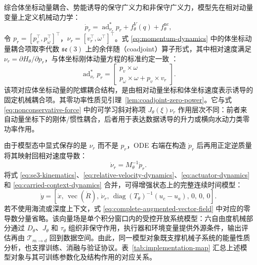 \documentclass[UTF8,zihao=-4]{ctexrep}
\newcommand{\se}{\mathfrak{se}}
\newcommand{\ad}{\operatorname{ad}}
\begin{document}
综合体坐标动量耦合、势能诱导的保守广义力和非保守广义力，模型先在相对动量变量上定义机械动力学：
\begin{equation}
  \dot p_r
  =
  \ad_{\nu_r}^\ast p_r
  +f_\theta^{V}(q)
  +f_\theta^{\mathrm{nc}},
  \label{eq:momentum-dynamics}
\end{equation}
令 \(p_r=[p_v^\top,p_\omega^\top]^\top\)，\(\nu_r=[v_r^\top,\omega^\top]^\top\)。式 \eqref{eq:momentum-dynamics} 中的体坐标动量耦合项取李代数 \(\se(3)\) 上的余伴随（coadjoint）算子形式，其中相对速度满足 \(\nu_r=\partial H_\theta/\partial p_r\)，与体坐标刚体动量方程的标准约定一致 \citep{bullo2004geometric,fossen2011handbook}：
\begin{equation}
  \ad_{\nu_r}^{\ast}p_r
  =
  \begin{bmatrix}
    p_v\times\omega\\
    p_\omega\times\omega+p_v\times v_r
  \end{bmatrix}.
  \label{eq:coadjoint-term}
\end{equation}
该项对应体坐标动量的陀螺耦合结构，是由相对动量坐标和体坐标速度表示诱导的固定机械耦合项。其零功率性质见引理~\ref{lem:coadjoint-zero-power}。它与式 \eqref{eq:nonconservative-force} 中的可学习斜对称项 \(J_\theta(\xi)\nu_r\) 作用层次不同：前者来自动量坐标下的刚体/惯性耦合，后者用于表达数据诱导的升力或横向水动力类零功率作用。

由于模型态中显式保存的是 \(\nu_r\) 而不是 \(p_r\)，ODE 右端在构造 \(\dot p_r\) 后再用正定逆质量将其映射回相对速度导数：
\begin{equation}
  \dot\nu_r=M_\theta^{-1}\dot p_r .
  \label{eq:relative-velocity-dynamics}
\end{equation}
将式 \eqref{eq:se3-kinematics}、\eqref{eq:relative-velocity-dynamics}、\eqref{eq:actuator-dynamics} 和 \eqref{eq:carried-context-dynamics} 合并，可得增强状态上的完整连续时间模型：
\begin{equation}
  \dot y
  =
  \left[
  \dot x,\,
  \operatorname{vec}(\dot R),\,
  \dot\nu_r,\,
  \operatorname{diag}(T_\theta)^{-1}(u_c-u_a),\,
  0,\,
  0,\,
  0
  \right].
  \label{eq:complete-augmented-vector-field}
\end{equation}
若不使用海流或深度上下文，式 \eqref{eq:complete-augmented-vector-field} 中对应的零导数分量省略。该向量场是单个积分窗口内的受控开放系统模型：六自由度机械部分通过 \(D_\theta\)、\(J_\theta\) 和 \(\tau_\theta\) 组织非保守作用，执行器和环境变量提供外源条件，输出评估再由 \(\mathcal{T}_{m\to d}\) 回到数据空间。由此，同一模型对象既支撑机械子系统的能量性质分析，也支撑训练、消融与验证协议。表~\ref{tab:implementation-map} 汇总上述模型对象与其可训练参数化及结构作用的对应关系。
\end{document}
